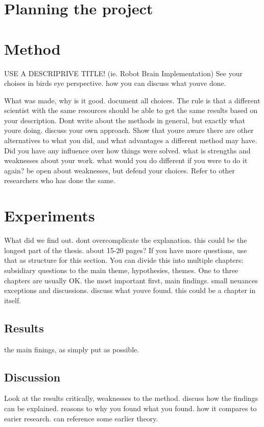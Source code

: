 \documentclass[twoside,a4paper,UKenglish,12pt]{report}     %
\begin{document}
\chapter{Planning the project}        %

\chapter{Method}
USE A DESCRIPRIVE TITLE! (ie. Robot Brain Implementation)
See your choises in birds eye perspective. how you can discuss what youve done.


What was made, why is it good. document all choices. The rule is that a different scientist with the same resources should be able to get the same results based on your description. Dont write about the methods in general, but exactly what youre doing. discuss your own approach. Show that youre aware there are other alternatives to what you did, and what advantages a different method may have. Did you have any influence over how things were solved. what is strengths and weaknesses about your work. what would you do different if you were to do it again? be open about weaknesses, but defend your choices. Refer to other researchers who has done the same. 
\chapter{Experiments}                     %
What did we find out. dont overcomplicate the explanation. this could be the longest part of the thesis. about 15-20 pages? If you have more questions, use that as structure for this section. You can divide this into multiple chapters: subsidiary questions to the main theme, hypothesies, themes. One to three chapters are usually OK. the most important first, main findings. small neuances exceptions and discussions. discuss what youve found. this could be a chapter in itself.
\section{Results}
the main finings, as simply put as possible.
\section{Discussion}
Look at the results critically, weaknesses to the method. discuss how the findings can be explained. reasons to why you found what you found. how it compares to earier research. can reference some earlier theory.
\end{document}
